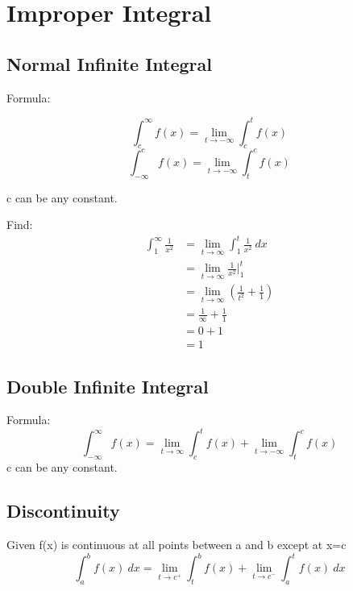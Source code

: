 \section{Improper Integral}
	\subsection{Normal Infinite Integral}
	Formula:
	\begin{multicols}{2}
	\noindent
	\begin{equation}
	\int^{\infty}_cf(x)=\lim_{t\rightarrow-\infty}\int^t_cf(x)
	\end{equation}
	\begin{equation}
	\int_{-\infty}^cf(x)=\lim_{t\rightarrow-\infty}\int_t^cf(x)
	\end{equation}
	\end{multicols}
	\noindent c can be any constant.
	
	\begin{simple}{}{}
	Find:
	\begin{align*}
	\int^\infty_1\frac{1}{x^2}&=\lim_{t\rightarrow\infty}\int^t_1\frac{1}{x^2}\ dx\\
	&=\lim_{t\rightarrow\infty}\frac{1}{x^2}\Big|^t_1\\
	&=\lim_{t\rightarrow\infty}\left(\frac{1}{t^2}+\frac{1}{1}\right)\\
	&=\frac{1}{\infty}+\frac{1}{1}\\
	&=0+1\\
	&=1
	\end{align*}
	\end{simple}
	
	\subsection{Double Infinite Integral}
	Formula:
	\begin{equation}
		\int^\infty_{-\infty} f(x)=\lim_{t\rightarrow\infty}			\int^t_cf(x)+\lim_{t\rightarrow-\infty}\int^c_tf(x)
	\end{equation}
	\noindent c can be any constant.
	
	\subsection{Discontinuity}
	Given f(x) is continuous at all points between a and b except  at x=c\\
	\begin{equation}
	\int^b_a f(x)\ dx=\lim_{t\rightarrow c^+}\int^b_t f(x)+\lim_{t\rightarrow c^-}\int^t_a f(x)\ dx
	\end{equation}
	
